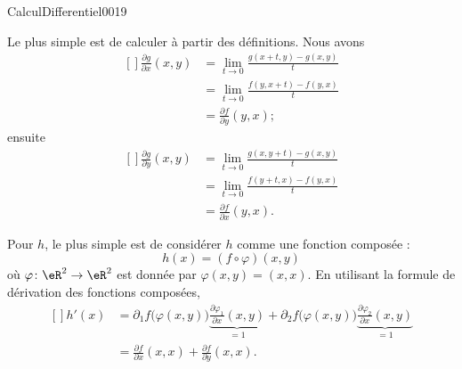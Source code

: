 \begin{corrige}{CalculDifferentiel0019}

	Le plus simple est de calculer à partir des définitions. Nous avons
	\begin{equation}
		\begin{aligned}[]
			\frac{ \partial g }{ \partial x }(x,y)&=\lim_{t\to 0} \frac{ g(x+t,y)-g(x,y) }{ t }\\
			&=\lim_{t\to 0} \frac{ f(y,x+t)-f(y,x) }{ t }\\
			&=\frac{ \partial f }{ \partial y }(y,x);
		\end{aligned}
	\end{equation}
	ensuite
	\begin{equation}
		\begin{aligned}[]
			\frac{ \partial g }{ \partial y }(x,y)&=\lim_{t\to 0} \frac{ g(x,y+t)-g(x,y) }{ t }\\
			&=\lim_{t\to 0} \frac{ f(y+t,x)-f(y,x) }{ t }\\
			&=\frac{ \partial f }{ \partial x }(y,x).
		\end{aligned}
	\end{equation}

	Pour $h$, le plus simple est de considérer $h$ comme une fonction composée :
	\begin{equation}
		h(x)=(f\circ\varphi)(x,y)
	\end{equation}
	où $\varphi\colon \eR^2\to \eR^2$ est donnée par $\varphi(x,y)=(x,x)$. En utilisant la formule de dérivation des fonctions composées,
	\begin{equation}
		\begin{aligned}[]
		h'(x)&=\partial_1f\big( \varphi(x,y) \big)\underbrace{\frac{ \partial \varphi_1 }{ \partial x }(x,y)}_{=1}+\partial_2f\big( \varphi(x,y) \big)\underbrace{\frac{ \partial \varphi_2 }{ \partial x }(x,y)}_{=1}\\
		&=\frac{ \partial f }{ \partial x }(x,x)+\frac{ \partial f }{ \partial y }(x,x).
		\end{aligned}
	\end{equation}

\end{corrige}
